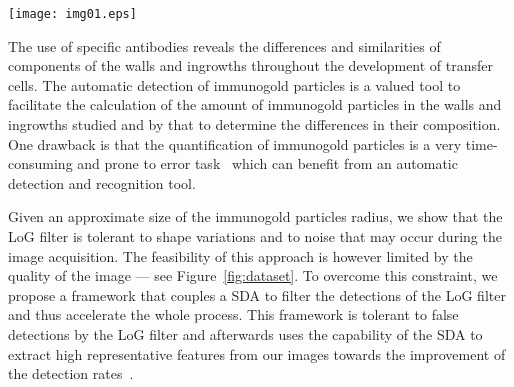 \documentclass[a4paper,11pt]{article}
\newcommand{\1}{\mathbbm{1}}
\newcommand{\fref}[1]{Figure~\ref{#1}}
\newcommand{\db}[1]{\texttt{#1}}
\theoremstyle{plain}
\begin{document}
\begin{figure*}[t]
  \begin{center}
    \texttt{[image: img01.eps]}
    \caption{Representative images of our datasets illustrating different structures that can interfere in the recognition of the immunogold particles due to: cellular overlapping, tissues and background noise. Each image has $4008\times 2670$ pixels of dimension with particles' \emph{diameter} ranging from 8 to 20 pixels. In this particular image we have a sample with a magnification of \db{15000} (scale of $1\mu m$ to the side of the image) with particles with a diameter of 8 pixels. Right to the main figure, we have a magnification of a cluster of immunogold particles with noise and background; in the bottom a magnification of the cluster is also depicted in a $20 \times 20$ patch containing two particles.}
    \label{fig:dataset}
  \end{center}
\end{figure*}

The use of specific antibodies reveals the differences and similarities of components of the walls and ingrowths throughout the development of transfer cells. The automatic detection of immunogold particles is a valued tool to facilitate the calculation of the amount of immunogold particles in the walls and ingrowths studied and by that to determine the differences in their composition. One drawback is that the quantification of immunogold particles is a very time-consuming and prone to error task~\cite{ribeiro2006computer} which can benefit from an automatic detection and recognition tool.

Given an approximate size of the immunogold particles radius, we show that the \acf{LoG} filter is tolerant to shape variations and to noise that may occur during the image acquisition. The feasibility of this approach is however limited by the quality of the image --- see \fref{fig:dataset}. To overcome this constraint, we propose a framework that couples a \acf{SDA} to filter the detections of the \ac{LoG} filter and thus accelerate the whole process. This framework is tolerant to false detections by the \ac{LoG} filter and afterwards uses the capability of the \ac{SDA} to extract high representative features from our images towards the improvement of the detection rates~\cite{RGamelasSousaICIAR2015}.
\end{document}
